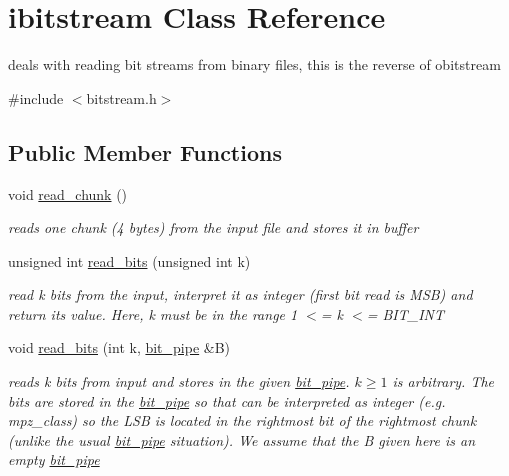 \hypertarget{classibitstream}{}\section{ibitstream Class Reference}
\label{classibitstream}


deals with reading bit streams from binary files, this is the reverse of obitstream  




{\ttfamily \#include $<$bitstream.\+h$>$}

\subsection*{Public Member Functions}
\begin{DoxyCompactItemize}
\item 
void \hyperlink{classibitstream_ac62c26004436d83f337f4aeba0895e20}{read\+\_\+chunk} ()
\begin{DoxyCompactList}\small\item\em reads one chunk (4 bytes) from the input file and stores it in buffer \end{DoxyCompactList}\item 
unsigned int \hyperlink{classibitstream_a2fdcaecf10fefa6942dcd5286a2696e0}{read\+\_\+bits} (unsigned int k)
\begin{DoxyCompactList}\small\item\em read k bits from the input, interpret it as integer (first bit read is M\+SB) and return its value. Here, k must be in the range 1 $<$= k $<$= B\+I\+T\+\_\+\+I\+NT \end{DoxyCompactList}\item 
void \hyperlink{classibitstream_a4bb7a698ab44c1e2fe21b4daa880bd6c}{read\+\_\+bits} (int k, \hyperlink{classbit__pipe}{bit\+\_\+pipe} \&B)
\begin{DoxyCompactList}\small\item\em reads k bits from input and stores in the given \hyperlink{classbit__pipe}{bit\+\_\+pipe}. $k \geq 1$ is arbitrary. The bits are stored in the \hyperlink{classbit__pipe}{bit\+\_\+pipe} so that can be interpreted as integer (e.\+g. mpz\+\_\+class) so the L\+SB is located in the rightmost bit of the rightmost chunk (unlike the usual \hyperlink{classbit__pipe}{bit\+\_\+pipe} situation). We assume that the B given here is an empty \hyperlink{classbit__pipe}{bit\+\_\+pipe} \end{DoxyCompactList}\item 

\end{DoxyCompactItemize}
